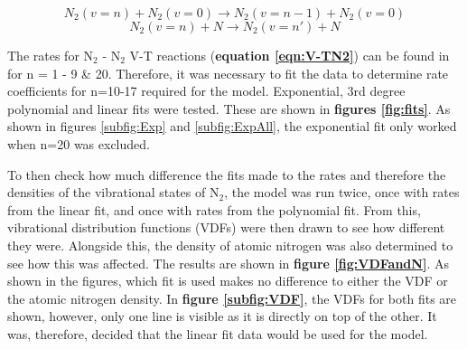 \documentclass[11pt, oneside]{article}   	%
\begin{document}
\begin{equation}
N_2(v=n) + N_2 (v=0) \rightarrow N_2(v=n-1) + N_2(v=0)
\label{eqn:V-TN2}
\end{equation}
\begin{equation}
N_2(v=n) + N \rightarrow N_2(v=n') + N
\label{eqn:V-TN}
\end{equation}


The rates for N$_2$ - N$_2$ V-T reactions (\textbf{equation \ref{eqn:V-TN2}}) can be found in  \cite{Billing1979vv} for n = 1 - 9 \& 20.
Therefore, it was necessary to fit the data to determine rate coefficients for n=10-17 required for the model.
Exponential, 3rd degree polynomial and linear fits were tested.
These are shown in \textbf{figures \ref{fig:fits}}.
As shown in figures \ref{subfig:Exp} and \ref{subfig:ExpAll}, the exponential fit only worked when n=20 was excluded.

To then check how much difference the fits made to the rates and therefore the densities of the vibrational states of N$_2$, the model was run twice, once with rates from the linear fit, and once with rates from the polynomial fit.
From this, vibrational distribution functions (VDFs) were then drawn to see how different they were.
Alongside this, the density of atomic nitrogen was also determined to see how this was affected.
The results are shown in \textbf{figure \ref{fig:VDFandN}}.
As shown in the figures, which fit is used makes no difference to either the VDF or the atomic nitrogen density.
In \textbf{figure \ref{subfig:VDF}}, the VDFs for both fits are shown, however, only one line is visible as it is directly on top of the other.
It was, therefore, decided that the linear fit data would be used for the model.



\end{document}
